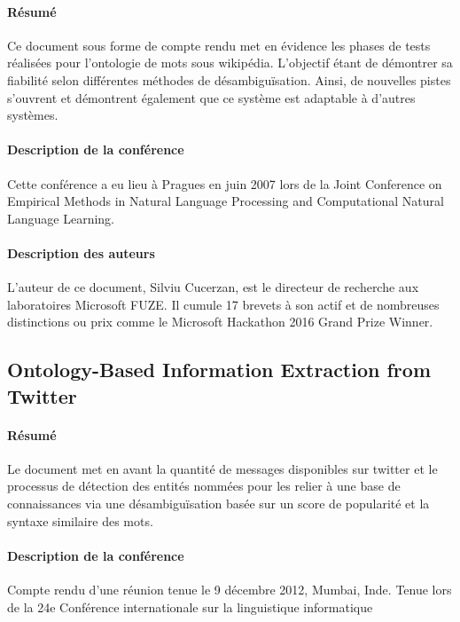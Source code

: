 \documentclass{article}
\begin{document}
\paragraph{Résumé}
Ce document sous forme de compte rendu met en évidence les phases de tests réalisées pour l'ontologie de mots sous wikipédia. L'objectif étant de démontrer sa fiabilité selon différentes méthodes de désambiguïsation. Ainsi, de nouvelles pistes s'ouvrent et démontrent également que ce système est adaptable à d'autres systèmes.

\paragraph{Description de la conférence}
Cette conférence a eu lieu à Pragues en juin 2007 lors de la Joint Conference on Empirical Methods in Natural Language Processing and Computational Natural Language Learning.

\paragraph{Description des auteurs}
L'auteur de ce document, Silviu Cucerzan, est le directeur de recherche aux laboratoires Microsoft FUZE. Il cumule 17 brevets à son actif et de nombreuses distinctions ou prix comme le Microsoft Hackathon 2016 Grand Prize Winner.

\subsection{Ontology-Based Information Extraction from Twitter\cite{article-2}}

\paragraph{Résumé}
Le document met en avant la quantité de messages disponibles sur twitter et le processus de détection des entités nommées pour les relier à une base de connaissances via une désambiguïsation basée sur un score de popularité et la syntaxe similaire des mots.

\paragraph{Description de la conférence}

Compte rendu d'une réunion tenue le 9 décembre 2012, Mumbai, Inde. Tenue lors de la 24e Conférence internationale sur la linguistique informatique
\end{document}
